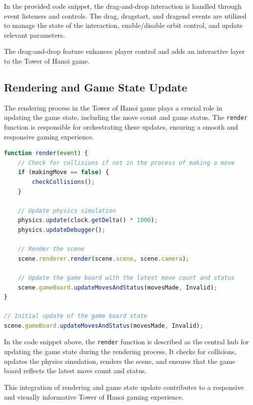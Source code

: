 \documentclass{article}
\begin{document}
In the provided code snippet, the drag-and-drop interaction is handled through event listeners and controls. The drag, dragstart, and dragend events are utilized to manage the state of the interaction, enable/disable orbit control, and update relevant parameters.

The drag-and-drop feature enhances player control and adds an interactive layer to the Tower of Hanoi game.

\subsection{Rendering and Game State Update}

The rendering process in the Tower of Hanoi game plays a crucial role in updating the game state, including the move count and game status. The \texttt{render} function is responsible for orchestrating these updates, ensuring a smooth and responsive gaming experience.

\begin{lstlisting}[language=JavaScript, caption={Rendering and Game State Update}]
function render(event) {
    // Check for collisions if not in the process of making a move
    if (makingMove == false) {
        checkCollisions();
    }

    // Update physics simulation
    physics.update(clock.getDelta() * 1000);
    physics.updateDebugger();

    // Render the scene
    scene.renderer.render(scene.scene, scene.camera);

    // Update the game board with the latest move count and status
    scene.gameBoard.updateMovesAndStatus(movesMade, Invalid);
}

// Initial update of the game board state
scene.gameBoard.updateMovesAndStatus(movesMade, Invalid);
\end{lstlisting}

In the code snippet above, the \texttt{render} function is described as the central hub for updating the game state during the rendering process. It checks for collisions, updates the physics simulation, renders the scene, and ensures that the game board reflects the latest move count and status.

This integration of rendering and game state update contributes to a responsive and visually informative Tower of Hanoi gaming experience.
\end{document}
